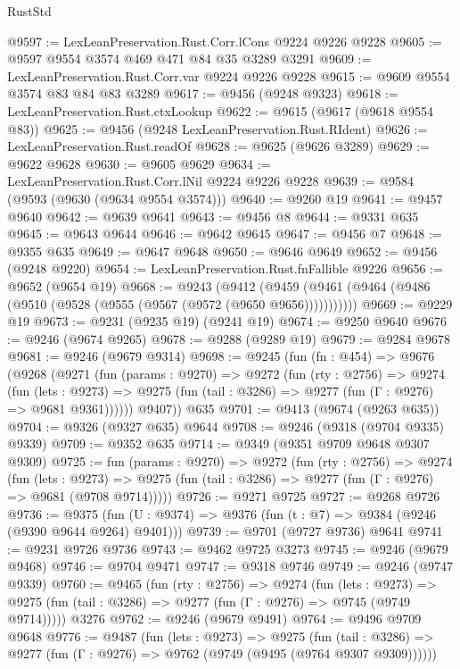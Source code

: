 \begin{lexlean}{RustStd}
\begin{coremodule}
@9597 := LexLeanPreservation.Rust.Corr.lCons @9224 @9226 @9228
@9605 := @9597 @9554 @3574 @469 @471 @84 @35 @3289 @3291
@9609 := LexLeanPreservation.Rust.Corr.var @9224 @9226 @9228
@9615 := @9609 @9554 @3574 @83 @84 @83 @3289
@9617 := @9456 (@9248 @9323)
@9618 := LexLeanPreservation.Rust.ctxLookup
@9622 := @9615 (@9617 (@9618 @9554 @83))
@9625 := @9456 (@9248 LexLeanPreservation.Rust.RIdent)
@9626 := LexLeanPreservation.Rust.readOf
@9628 := @9625 (@9626 @3289)
@9629 := @9622 @9628
@9630 := @9605 @9629
@9634 := LexLeanPreservation.Rust.Corr.lNil @9224 @9226 @9228
@9639 := @9584 (@9593 (@9630 (@9634 @9554 @3574)))
@9640 := @9260 @19
@9641 := @9457 @9640
@9642 := @9639 @9641
@9643 := @9456 @8
@9644 := @9331 @635
@9645 := @9643 @9644
@9646 := @9642 @9645
@9647 := @9456 @7
@9648 := @9355 @635
@9649 := @9647 @9648
@9650 := @9646 @9649
@9652 := @9456 (@9248 @9220)
@9654 := LexLeanPreservation.Rust.fnFallible @9226
@9656 := @9652 (@9654 @19)
@9668 := @9243
    (@9412 (@9459 (@9461 (@9464 (@9486 (@9510 (@9528 (@9555 (@9567 (@9572 (@9650 @9656)))))))))))
@9669 := @9229 @19
@9673 := @9231 (@9235 @19) (@9241 @19)
@9674 := @9250 @9640
@9676 := @9246 (@9674 @9265)
@9678 := @9288 (@9289 @19)
@9679 := @9284 @9678
@9681 := @9246 (@9679 @9314)
@9698 := @9245
    (fun (fn : @454) =>
    @9676
      (@9268
        (@9271
          (fun (params : @9270) =>
          @9272
            (fun (rty : @2756) =>
            @9274
              (fun (lets : @9273) =>
              @9275 (fun (tail : @3286) => @9277 (fun (Γ : @9276) => @9681 @9361))))))
        @9407))
    @635
@9701 := @9413 (@9674 (@9263 @635))
@9704 := @9326 (@9327 @635) @9644
@9708 := @9246 (@9318 (@9704 @9335) @9339)
@9709 := @9352 @635
@9714 := @9349 (@9351 @9709 @9648 @9307 @9309)
@9725 := fun (params : @9270) =>
  @9272
    (fun (rty : @2756) =>
    @9274
      (fun (lets : @9273) =>
      @9275 (fun (tail : @3286) => @9277 (fun (Γ : @9276) => @9681 (@9708 @9714)))))
@9726 := @9271 @9725
@9727 := @9268 @9726
@9736 := @9375 (fun (U : @9374) => @9376 (fun (t : @7) => @9384 (@9246 (@9390 @9644 @9264) @9401)))
@9739 := @9701 (@9727 @9736) @9641
@9741 := @9231 @9726 @9736
@9743 := @9462 @9725 @3273
@9745 := @9246 (@9679 @9468)
@9746 := @9704 @9471
@9747 := @9318 @9746
@9749 := @9246 (@9747 @9339)
@9760 := @9465
    (fun (rty : @2756) =>
    @9274
      (fun (lets : @9273) =>
      @9275 (fun (tail : @3286) => @9277 (fun (Γ : @9276) => @9745 (@9749 @9714)))))
    @3276
@9762 := @9246 (@9679 @9491)
@9764 := @9496 @9709 @9648
@9776 := @9487
    (fun (lets : @9273) =>
    @9275
      (fun (tail : @3286) => @9277 (fun (Γ : @9276) => @9762 (@9749 (@9495 (@9764 @9307 @9309))))))

\end{coremodule}
\end{lexlean}
